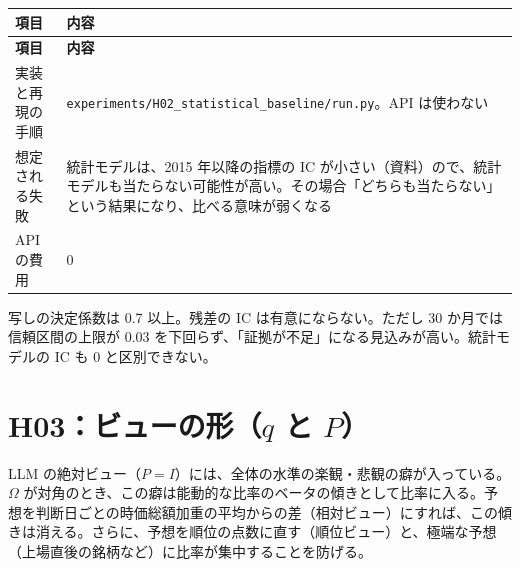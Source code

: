 \documentclass[xelatex,ja=standard,jafont=haranoaji,a4paper,10pt,openany]{bxjsreport}
\newcommand{\code}[1]{\texttt{#1}}
\newenvironment{plan}{\small\begin{longtable}{p{3.3cm}p{11.6cm}}\toprule\textbf{項目} & \textbf{内容} \\\midrule\endfirsthead
\toprule\textbf{項目} & \textbf{内容} \\\midrule\endhead\bottomrule\endfoot}{\end{longtable}}
\begin{document}
\begin{plan}
実装と再現の手順 & \code{experiments/H02\_statistical\_baseline/run.py}。API は使わない \\
想定される失敗 & 統計モデルは、2015 年以降の指標の IC が小さい（資料）ので、統計モデルも当たらない可能性が高い。その場合「どちらも当たらない」という結果になり、比べる意味が弱くなる \\
API の費用 & 0 \\
\end{plan}

\begin{predbox}
写しの決定係数は 0.7 以上。残差の IC は有意にならない。ただし 30 か月では信頼区間の上限が 0.03 を下回らず、「証拠が不足」になる見込みが高い。統計モデルの IC も 0 と区別できない。
\end{predbox}

\chapter{H03：ビューの形（$q$ と $P$）}\label{ch:h03}

\begin{hypbox}
LLM の絶対ビュー（$P=I$）には、全体の水準の楽観・悲観の癖が入っている。$\Omega$ が対角のとき、この癖は能動的な比率のベータの傾きとして比率に入る。予想を判断日ごとの時価総額加重の平均からの差（相対ビュー）にすれば、この傾きは消える。さらに、予想を順位の点数に直す（順位ビュー）と、極端な予想（上場直後の銘柄など）に比率が集中することを防げる。
\end{hypbox}
\end{document}
